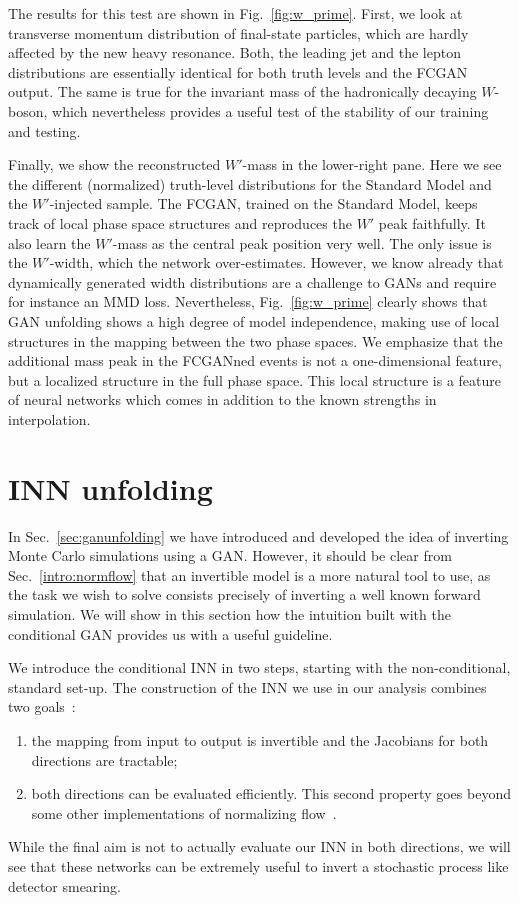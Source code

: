 The results for this test are shown in Fig.~\ref{fig:w_prime}. First,
we look at transverse momentum distribution of final-state particles,
which are hardly affected by the new heavy resonance. Both, the
leading jet and the lepton distributions are essentially identical for
both truth levels and the FCGAN output. The same is true for the
invariant mass of the hadronically decaying $W$-boson, which
nevertheless provides a useful test of the stability of our training
and testing.

Finally, we show the reconstructed $W'$-mass in the lower-right
pane. Here we see the different (normalized) truth-level distributions
for the Standard Model and the $W'$-injected sample. The FCGAN,
trained on the Standard Model, keeps track of local phase space
structures and reproduces the $W'$ peak faithfully. It also learn the
$W'$-mass as the central peak position very well. The only issue is
the $W'$-width, which the network over-estimates. However, we know
already that dynamically generated width distributions are a challenge
to GANs and require for instance an MMD loss.  Nevertheless,
Fig.~\ref{fig:w_prime} clearly shows that GAN unfolding shows a high
degree of model independence, making use of local structures in the
mapping between the two phase spaces. We emphasize that the additional
mass peak in the FCGANned events is not a one-dimensional feature, but
a localized structure in the full phase space. This local structure is
a feature of neural networks which comes in addition to the known
strengths in interpolation.


\section{INN unfolding}
\label{sec:inn}

In Sec.~\ref{sec:ganunfolding} we have introduced and developed the idea
of inverting Monte Carlo simulations using a GAN. However, it should be 
clear from Sec.~\ref{intro:normflow} that an invertible model is a more
natural tool to use, as the task we wish to solve consists precisely of 
inverting a well known forward simulation. We will show in this section how
the intuition built with the conditional GAN provides us with a useful 
guideline.

We introduce the conditional INN in two steps, starting with the
non-conditional, standard set-up. The construction of the INN we use in
our analysis combines two goals~\cite{inn}:
%
\begin{enumerate}
\item the mapping from input to output is invertible and the Jacobians
  for both directions are tractable;
\item both directions can be evaluated efficiently. This second
  property goes beyond some other implementations of normalizing
  flow~\cite{nflow1,nflow_review}.
\end{enumerate}
%
While the final aim is not to actually evaluate our INN in both directions, we will
see that these networks can be extremely useful to invert a stochastic
process like detector smearing.

